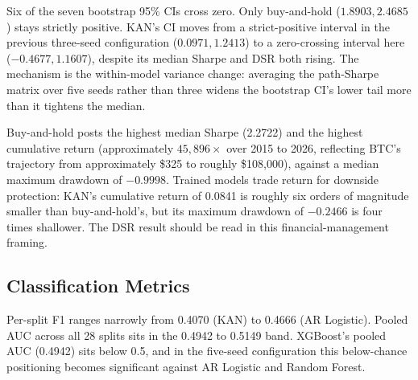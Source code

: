 \documentclass[12pt,a4paper,oneside]{article}
\begin{document}
Six of the seven bootstrap 95\% CIs cross zero. Only buy-and-hold ($1.8903, 2.4685$) stays strictly positive. KAN's CI moves from a strict-positive interval in the previous three-seed configuration ($0.0971, 1.2413$) to a zero-crossing interval here ($-0.4677, 1.1607$), despite its median Sharpe and DSR both rising. The mechanism is the within-model variance change: averaging the path-Sharpe matrix over five seeds rather than three widens the bootstrap CI's lower tail more than it tightens the median.

Buy-and-hold posts the highest median Sharpe (2.2722) and the highest cumulative return (approximately $45{,}896\times$ over 2015 to 2026, reflecting BTC's trajectory from approximately \$325 to roughly \$108,000), against a median maximum drawdown of $-0.9998$. Trained models trade return for downside protection: KAN's cumulative return of 0.0841 is roughly six orders of magnitude smaller than buy-and-hold's, but its maximum drawdown of $-0.2466$ is four times shallower. The DSR result should be read in this financial-management framing.


\subsection{Classification Metrics}\label{subsec:results_classification}

Per-split F1 ranges narrowly from 0.4070 (KAN) to 0.4666 (AR Logistic). Pooled AUC across all 28 splits sits in the 0.4942 to 0.5149 band. XGBoost's pooled AUC (0.4942) sits below 0.5, and in the five-seed configuration this below-chance positioning becomes significant against AR Logistic and Random Forest.
\end{document}
